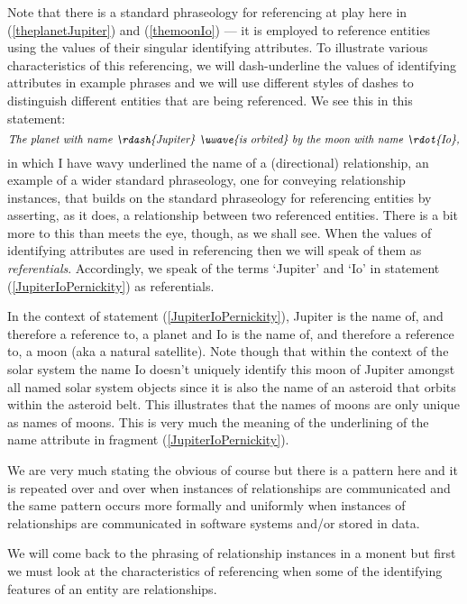 Note that there is a standard phraseology for referencing
at play here in (\ref{theplanetJupiter}) and (\ref{themoonIo})  ---
it is employed to reference entities using the values of their singular identifying attributes. 
To illustrate various characteristics of this referencing, 
we will dash-underline the values of identifying attributes in example phrases 
and we will use different styles of dashes to distinguish different entities that are being referenced. We see this in this statement: 
\begin{equation}
\label{JupiterIoPernickity}
\mbox{\textit{The planet with name \rdash{Jupiter} 
\uwave{is orbited} by the moon with name \rdot{Io},}}
\end{equation}
in which I have wavy underlined the name of a (directional) relationship,
an example of a wider standard phraseology, one  for conveying relationship instances,
that builds on the standard phraseology for referencing entities
by asserting, as it does,  a relationship between two referenced entities.
There is a bit more to this than meets the eye, though, as we shall see.
\mynote
When the values of identifying attributes are used in referencing then we will speak of them as \textit{referentials}. 
Accordingly, we speak of the terms `Jupiter' and `Io' in statement (\ref{JupiterIoPernickity}) as referentials.

In the context of statement (\ref{JupiterIoPernickity}), Jupiter is the name of, and therefore  a reference to, a planet and  Io is the name of, and therefore a reference to, a moon (aka a natural satellite).
Note though that within the context of the solar system the name Io  doesn't uniquely identify this moon of Jupiter amongst all named solar system objects since it is also the name of an asteroid that orbits within the asteroid belt. This  illustrates that 
the names of moons are only unique as names of moons. This is very much the meaning of the underlining of the name attribute in fragment (\ref{JupiterIoPernickity}). 

\mynote
We are very much stating the obvious of course but there is a pattern here and it is repeated over and over when instances of relationships are communicated  and the same pattern occurs more formally  and uniformly when instances of relationships are communicated in software systems and/or stored in data.

We will come back to the phrasing of relationship instances in a monent but first we must look at the characteristics of referencing when some of the identifying features of an entity are relationships.

